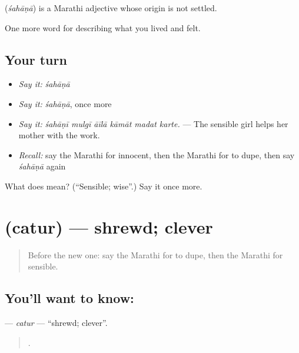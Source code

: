 \begin{cousinweb}
\textbf{} (\emph{śahāṇā}) is a Marathi adjective whose origin is not settled.
\end{cousinweb}

\begin{grammarlens}[title={What you've built}]
One more word for describing what you lived and felt.
\end{grammarlens}

\subsection*{Your turn}
\begin{itemize}
\raggedright
  \item \emph{Say it:} \emph{śahāṇā}
  \item \emph{Say it:} \emph{śahāṇā}, once more
  \item \emph{Say it:} \emph{śahāṇī mulgī āīlā kāmāt madat karte.} — The sensible girl helps her mother with the work.
  \item \emph{Recall:} say the Marathi for innocent, then the Marathi for to dupe, then say \emph{śahāṇā} again
\end{itemize}

\begin{tcolorbox}[breakable,colback=teal!4,colframe=teal!35!black,title={Before you move on}]
What does  mean? (\textquotedblleft{}Sensible; wise\textquotedblright{}.) Say it once more.
\end{tcolorbox}
\section[\texorpdfstring{\mr{चतुर} (catur)}{चतुर (catur)}]{ (catur) — shrewd; clever}

\label{lesson:MR-C471-catur}



\begin{quote}
Before the new one: say the Marathi for to dupe, then the Marathi for sensible.
\end{quote}

\subsection*{You'll want to know: }
\textbf{} — \emph{catur} — \textquotedblleft{}shrewd; clever\textquotedblright{}.

\begin{quote}
   .
\end{quote}

